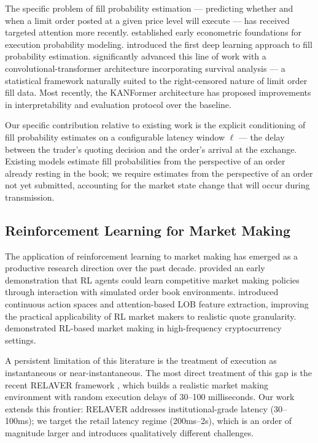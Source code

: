 \documentclass[12pt]{article}
\begin{document}
The specific problem of fill probability estimation --- predicting whether and when a limit order posted at a given price level will execute --- has received targeted attention more recently. \citet{lo2002} established early econometric foundations for execution probability modeling. \citet{maglaras2022} introduced the first deep learning approach to fill probability estimation. \citet{arroyo2024} significantly advanced this line of work with a convolutional-transformer architecture incorporating survival analysis --- a statistical framework naturally suited to the right-censored nature of limit order fill data. Most recently, the KANFormer architecture \citep{kanformer2024} has proposed improvements in interpretability and evaluation protocol over the \citeauthor{arroyo2024} baseline.

Our specific contribution relative to existing work is the explicit conditioning of fill probability estimates on a configurable latency window $\ell$ --- the delay between the trader's quoting decision and the order's arrival at the exchange. Existing models estimate fill probabilities from the perspective of an order already resting in the book; we require estimates from the perspective of an order not yet submitted, accounting for the market state change that will occur during transmission.

\subsection{Reinforcement Learning for Market Making}

The application of reinforcement learning to market making has emerged as a productive research direction over the past decade. \citet{spooner2018} provided an early demonstration that RL agents could learn competitive market making policies through interaction with simulated order book environments. \citet{guo2023} introduced continuous action spaces and attention-based LOB feature extraction, improving the practical applicability of RL market makers to realistic quote granularity. \citet{briola2021} demonstrated RL-based market making in high-frequency cryptocurrency settings.

A persistent limitation of this literature is the treatment of execution as instantaneous or near-instantaneous. The most direct treatment of this gap is the recent RELAVER framework \citep{jiang2025}, which builds a realistic market making environment with random execution delays of 30--100 milliseconds. Our work extends this frontier: RELAVER addresses institutional-grade latency (30--100ms); we target the retail latency regime (200ms--2s), which is an order of magnitude larger and introduces qualitatively different challenges.
\end{document}
